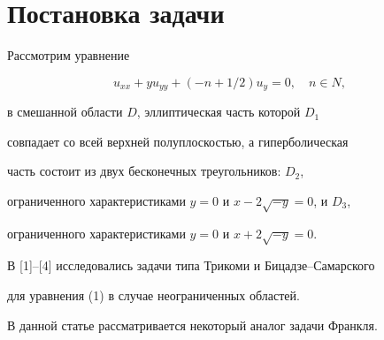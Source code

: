 \label{begin}








\section{Постановка задачи}





Рассмотрим уравнение


\begin{equation}


u_{xx}+yu_{yy}+ (-n+1/2) u_y=0, \quad n \in N,


\end{equation}


в смешанной области $D$, эллиптическая часть которой $D_1$


совпадает со всей верхней полуплоскостью, а гиперболическая


часть состоит из двух бесконечных треугольников: $D_2$,


ограниченного характеристиками $y=0$ и $x-2\sqrt {-y}=0$, и $D_3$,


ограниченного характеристиками $y=0 $ и $x+2\sqrt {-y}=0 $.





В [1]--[4] исследовались задачи типа Трикоми и Бицадзе--Самарского


для уравнения (1) в случае неограниченных областей.


В данной статье рассматривается некоторый аналог задачи Франкля.


\medskip





